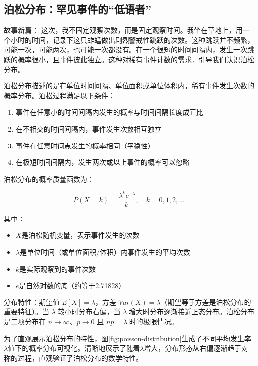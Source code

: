 \documentclass[
  twoside,12pt,fontset=none]{ctexbook}
\providecommand{\tightlist}{%
  \setlength{\itemsep}{0pt}\setlength{\parskip}{0pt}}
\begin{document}
\hypertarget{ux6ccaux677eux5206ux5e03ux7f55ux89c1ux4e8bux4ef6ux7684ux4f4eux8bedux8005}{%
\subsection{泊松分布：罕见事件的``低语者''}\label{ux6ccaux677eux5206ux5e03ux7f55ux89c1ux4e8bux4ef6ux7684ux4f4eux8bedux8005}}

故事新篇： 这次，我不固定观察次数，而是固定观察时间。我坐在草地上，用一个小时的时间，记录下这只蚱蜢做出剧烈警戒性跳跃的次数。这种跳跃并不频繁，可能一次，可能两次，也可能一次都没有。在一个很短的时间间隔内，发生一次跳跃的概率很小，且事件彼此独立。这种对稀有事件计数的需求，引导我们认识泊松分布。

泊松分布描述的是在单位时间间隔、单位面积或单位体积内，稀有事件发生次数的概率分布。泊松过程满足以下条件：

\begin{enumerate}
\def\labelenumi{\arabic{enumi}.}
\tightlist
\item
  事件在任意小的时间间隔内发生的概率与时间间隔长度成正比
\item
  在不相交的时间间隔内，事件发生次数相互独立
\item
  事件在任意时间点发生的概率相同（平稳性）
\item
  在极短时间间隔内，发生两次或以上事件的概率可以忽略
\end{enumerate}

泊松分布的概率质量函数为：

\[P(X = k) = \frac{\lambda^k e^{-\lambda}}{k!}, \quad k = 0, 1, 2, \ldots\]

其中：

\begin{itemize}
\tightlist
\item
  \(X\)是泊松随机变量，表示事件发生的次数
\item
  \(\lambda\)是单位时间（或单位面积/体积）内事件发生的平均次数
\item
  \(k\)是实际观察到的事件次数
\item
  \(e\)是自然对数的底（约等于2.71828）
\end{itemize}

分布特性：期望值 \(E[X] = \lambda\)，方差 \(Var(X) = \lambda\)（期望等于方差是泊松分布的重要特征）。当 \(\lambda\) 较小时分布右偏，当 \(\lambda\) 增大时分布逐渐接近正态分布。泊松分布是二项分布在 \(n \to \infty\)、\(p \to 0\) 且 \(np = \lambda\) 时的极限情况。

为了直观展示泊松分布的特性，图\ref{fig:poisson-distribution}生成了不同平均发生率\(\lambda\)值下的概率分布可视化。清晰地展示了随着\(\lambda\)增大，分布形态从右偏逐渐趋于对称的过程，直观验证了泊松分布的数学特性。
\end{document}
